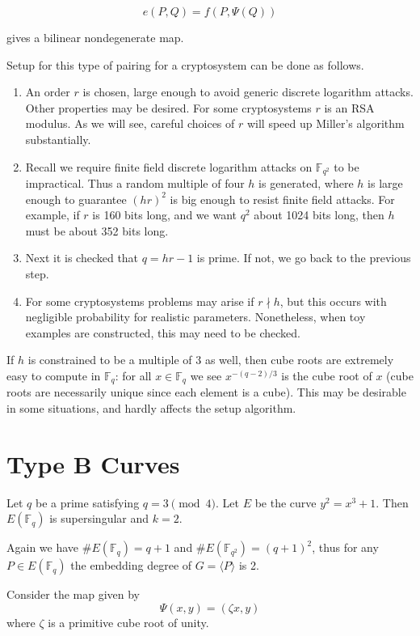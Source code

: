 \[ e(P,Q) = f(P, \Psi(Q)) \]

gives a bilinear nondegenerate map.

Setup for this type of pairing for a cryptosystem can be done as follows.

\begin{enumerate}
\item
An order $r$ is chosen, large enough to avoid generic discrete logarithm
attacks. Other properties may be desired. For some cryptosystems $r$ is
an RSA modulus. As we will see, careful choices of $r$ will speed up Miller's
algorithm substantially.
\item
Recall we require finite field discrete logarithm attacks on $\mathbb{F}_{q^2}$
to be impractical. Thus a random multiple of four $h$ is generated,
where $h$ is large enough to guarantee $(hr)^2$ is big enough to resist
finite field attacks. For example, if $r$ is 160 bits long, and we want
$q^2$ about 1024 bits long, then $h$ must be about 352 bits long.
\item
Next it is checked that $q = h r - 1$ is prime.
If not, we go back to the previous step.
\item
For some cryptosystems problems may arise if $r \nmid h$, but this occurs
with negligible probability for realistic parameters. Nonetheless, when toy
examples are constructed, this may need to be checked.
\end{enumerate}

If $h$ is constrained to be a multiple of $3$ as well, then cube roots are
extremely easy to compute in $\mathbb{F}_{q}$:
for all $x \in \mathbb{F}_q$ we see $x^{-(q-2)/3}$ is the cube root of $x$
(cube roots are necessarily unique since each element is a cube).
This may be desirable in some situations, and hardly affects the setup
algorithm.

\section {Type B Curves}

Let $q$ be a prime satisfying $q = 3 \pmod{4}$.
Let $E$ be the curve $y^2 = x^3 + 1$. Then
$E(\mathbb{F}_q)$ is supersingular and $k = 2$.

Again we have $\#E(\mathbb{F}_q) = q+1$ and $\#E(\mathbb{F}_{q^2}) = (q+1)^2$,
thus for any $P\in E(\mathbb{F}_q)$
the embedding degree of $G = \langle P \rangle$ is 2.

Consider the map given by
\[ \Psi(x, y) = (\zeta x, y) \]
where $\zeta$ is a primitive cube root of unity.

